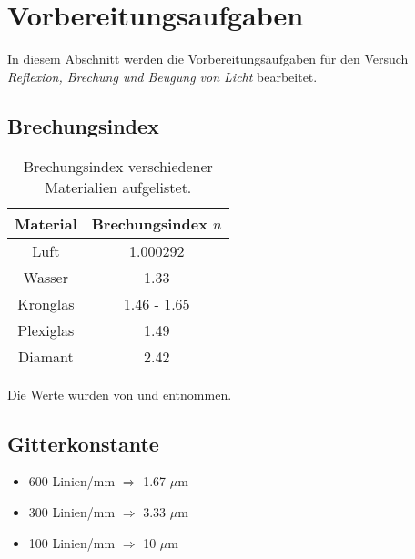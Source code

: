 \section{Vorbereitungsaufgaben}
\label{sec:Vorbereitungsaufgaben}

In diesem Abschnitt werden die Vorbereitungsaufgaben für den Versuch
\textit{Reflexion, Brechung und Beugung von Licht} bearbeitet.

\subsection{Brechungsindex}

\begin{table}
    \centering
    \caption{Brechungsindex verschiedener Materialien aufgelistet.}
    \begin{tabular}{c c}
        \toprule
        Material & Brechungsindex $n$ \\
        \midrule
        Luft & 1.000292 \\
        Wasser & 1.33 \\
        Kronglas & 1.46 - 1.65 \\
        Plexiglas & 1.49 \\
        Diamant & 2.42 \\
        \bottomrule
    \end{tabular}
    \label{tab:Brechungsindex}
\end{table}

Die Werte wurden von \cite{Chemie.de} und \cite{ISO489} entnommen.

\subsection{Gitterkonstante}

\begin{itemize}
    \item 600 Linien/mm $\Rightarrow$ 1.67 $\mu$m
    \item 300 Linien/mm $\Rightarrow$ 3.33 $\mu$m
    \item 100 Linien/mm $\Rightarrow$ 10 $\mu$m
\end{itemize}
\newpage